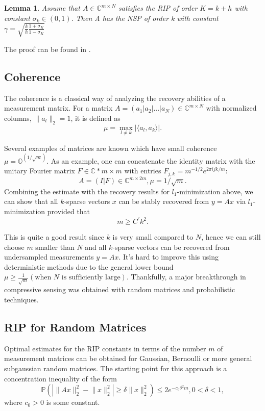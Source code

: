 \documentclass[
  english,        %
  font=times,     %
  onecolumn,      %
]{tumarticle}
\newtheorem{lemma}{Lemma}[section]
\numberwithin{equation}{section} %
\begin{document}
\begin{large}
\begin{adjustwidth}{0pt}{0pt}
\begin{lemma}
Assume that $A \in \mathbb{C}^{m \times N}$ satisfies the RIP of order $K = k + h$ with constant $\sigma_k \in (0,1)$. Then A has the NSP of order k with constant $\gamma = \sqrt{\frac{k}{h}\frac{1+\sigma_K}{1-\sigma_K}}$
\end{lemma}

The proof can be found in \cite{CS}.

\subsection{Coherence}
The coherence is a classical way of analyzing the recovery abilities of a measurement matrix. For a matrix $A = (a_1|a_2|...|a_N) \in \mathbb{C}^{m \times N}$ with normalized columns, $\lVert a_l \rVert_2 = 1$, it is defined as
\[ \mu = \max_{l \neq k} |\langle a_l, a_k \rangle| .\]

Several examples of matrices are known which have small coherence $\mu = \mathbb{O}^(1/\sqrt{m})$. As an example, one can concatenate the identity matrix with the unitary Fourier matrix $F \in \mathbb{C}*{m \times m}$ with entries $F_{j,k} = m^{-1/2} e^{2 \pi i j k / m}$:
\[A = (I|F) \in \mathbb{C}^{m \times 2m}, \mu = 1/\sqrt{m}. \]
Combining the estimate with the recovery results for $l_1$-minimization above, we can show that all $k$-sparse vectors $x$ can be stably recovered from $y = Ax$ via $l_1$-minimization provided that
\[ m \geq C^{\prime} k^2. \]

This is quite a good result since $k$ is very small compared to $N$, hence we can still choose $m$ smaller than $N$ and all $k$-sparse vectors can be recovered from undersampled measurements $y = Ax$. It's hard to improve this using deterministic methods due to the general lower bound $\mu \geq \frac{1}{\sqrt{m}} (\text{when }N \text{ is sufficiently large})$. Thankfully, a major breakthrough in compressive sensing was obtained with random matrices and probabilistic techniques.

\subsection{RIP for Random Matrices}
Optimal estimates for the RIP constants in terms of the number $m$ of measurement matrices can be obtained for Gaussian, Bernoulli or more general subgaussian random matrices. The starting point for this approach is a concentration inequality of the form
\[ \mathbb{P} (|\lVert Ax \rVert_2^2 - \lVert x \rVert_2^2| \geq \delta \lVert x \rVert_2^2 ) \leq 2 e^{-c_0 \delta^2 m}, 0 < \delta < 1, \]
where $c_0 > 0$ is some constant.


\end{adjustwidth}
\end{large}
\end{document}
